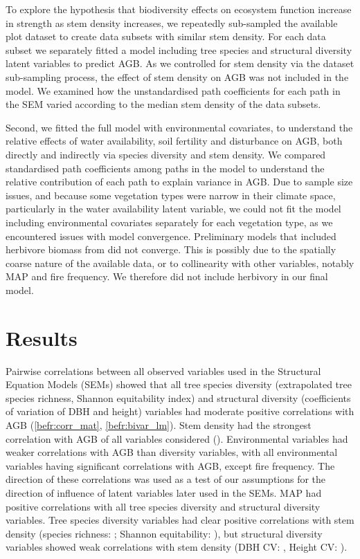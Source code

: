 \begin{refsection}
To explore the hypothesis that biodiversity effects on ecosystem function increase in strength as stem density increases, we repeatedly sub-sampled the available plot dataset to create \subn{} data subsets with similar stem density. For each data subset we separately fitted a model including tree species and structural diversity latent variables to predict AGB. As we controlled for stem density via the dataset sub-sampling process, the effect of stem density on AGB was not included in the model. We examined how the unstandardised path coefficients for each path in the SEM varied according to the median stem density of the data subsets. 

Second, we fitted the full model with environmental covariates, to understand the relative effects of water availability, soil fertility and disturbance on AGB, both directly and indirectly via species diversity and stem density. We compared standardised path coefficients among paths in the model to understand the relative contribution of each path to explain variance in AGB. Due to sample size issues, and because some vegetation types were narrow in their climate space, particularly in the water availability latent variable, we could not fit the model including environmental covariates separately for each vegetation type, as we encountered issues with model convergence. Preliminary models that included herbivore biomass from \citet{Hempson2017} did not converge. This is possibly due to the spatially coarse nature of the available data, or to collinearity with other variables, notably MAP and fire frequency. We therefore did not include herbivory in our final model.

\section{Results}
\label{befr:sec:results}

Pairwise correlations between all observed variables used in the Structural Equation Models (SEMs) showed that all tree species diversity (extrapolated tree species richness, Shannon equitability index) and structural diversity (coefficients of variation of DBH and height) variables had moderate positive correlations with AGB (\autoref{befr:corr_mat}, \autoref{befr:bivar_lm}). Stem density had the strongest correlation with AGB of all variables considered (\ccib{}). Environmental variables had weaker correlations with AGB than diversity variables, with all environmental variables having significant correlations with AGB, except fire frequency. The direction of these correlations was used as a test of our assumptions for the direction of influence of latent variables later used in the SEMs. MAP had positive correlations with all tree species diversity and structural diversity variables. Tree species diversity variables had clear positive correlations with stem density (species richness: \ccsi{}; Shannon equitability: \ccei{}), but structural diversity variables showed weak correlations with stem density (DBH CV: \ccdvi{}, Height CV: \cchvi{}).


\end{refsection}
